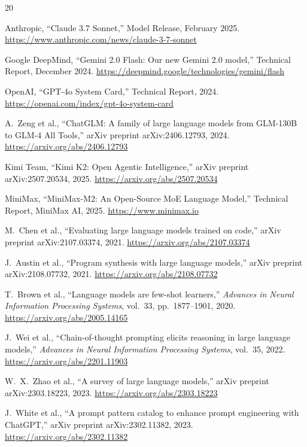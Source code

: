 \documentclass[conference]{IEEEtran}
\begin{document}
\begin{thebibliography}{20}

Anthropic, ``Claude 3.7 Sonnet,'' Model Release, February 2025.
\url{https://www.anthropic.com/news/claude-3-7-sonnet}

Google DeepMind, ``Gemini 2.0 Flash: Our new Gemini 2.0 model,''
Technical Report, December 2024.
\url{https://deepmind.google/technologies/gemini/flash}

OpenAI, ``GPT-4o System Card,'' Technical Report, 2024.
\url{https://openai.com/index/gpt-4o-system-card}

A.\ Zeng et al., ``ChatGLM: A family of large language models from GLM-130B to
GLM-4 All Tools,'' arXiv preprint arXiv:2406.12793, 2024.
\url{https://arxiv.org/abs/2406.12793}

Kimi Team, ``Kimi K2: Open Agentic Intelligence,''
arXiv preprint arXiv:2507.20534, 2025.
\url{https://arxiv.org/abs/2507.20534}

MiniMax, ``MiniMax-M2: An Open-Source MoE Language Model,''
Technical Report, MiniMax AI, 2025.
\url{https://www.minimax.io}

M.\ Chen et al., ``Evaluating large language models trained on code,''
arXiv preprint arXiv:2107.03374, 2021.
\url{https://arxiv.org/abs/2107.03374}

J.\ Austin et al., ``Program synthesis with large language models,''
arXiv preprint arXiv:2108.07732, 2021.
\url{https://arxiv.org/abs/2108.07732}

T.\ Brown et al., ``Language models are few-shot learners,''
\textit{Advances in Neural Information Processing Systems}, vol.~33,
pp.~1877--1901, 2020.
\url{https://arxiv.org/abs/2005.14165}

J.\ Wei et al., ``Chain-of-thought prompting elicits reasoning in large language
models,'' \textit{Advances in Neural Information Processing Systems}, vol.~35, 2022.
\url{https://arxiv.org/abs/2201.11903}

W.\ X.\ Zhao et al., ``A survey of large language models,''
arXiv preprint arXiv:2303.18223, 2023.
\url{https://arxiv.org/abs/2303.18223}

J.\ White et al., ``A prompt pattern catalog to enhance prompt engineering with
ChatGPT,'' arXiv preprint arXiv:2302.11382, 2023.
\url{https://arxiv.org/abs/2302.11382}


\end{thebibliography}
\end{document}
